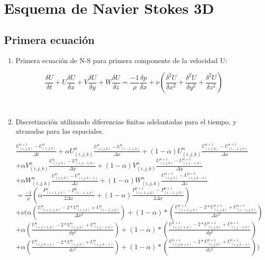 \documentclass[a4paper]{article}
\begin{document}
\newpage
\section{Esquema de Navier Stokes 3D}
\subsection{Primera ecuación}

\begin{enumerate}

\item Primera ecuación de N-S para primera componente de la velocidad U:

$$ \frac{\delta U}{\delta t} + U \frac{\delta U}{\delta x} + V \frac{\delta U}{\delta y} + W \frac{\delta U}{\delta z} =  \frac{-1}{\rho} \frac{\delta p}{\delta x} + \nu (\frac{{\delta}^{2} U}{\delta {x}^{2}} + \frac{{\delta}^{2} U}{\delta {y}^{2}} + \frac{{\delta}^{2} U}{\delta {z}^{2}}) $$

~\\

\item Discretización utilizando diferencias finitas adelantadas para el tiempo, y atrasadas para las espaciales.

$ \frac{ {U}^{n+1}_{(i,j,k)} - U^{n}_{(i,j,k)}}{ \Delta t}  +  \alpha {U}^{n}_{(i,j,k)} \frac{ {U}^{n}_{(i,j,k)} - U^{n}_{(i-1,j,k)}}{ \Delta x} + (1 - \alpha) {U}^{n}_{(i,j,k)} \frac{ {U}^{n+1}_{(i,j,k)} - U^{n+1}_{(i-1,j,k)}}{ \Delta x}$ 
\\
$+ \alpha {V}^{n}_{(i,j,k)} \frac{ {U}^{n}_{(i,j,k)} - U^{n}_{(i,j-1,k)}}{ \Delta y} + (1 - \alpha) {V}^{n}_{(i,j,k)} \frac{ {U}^{n+1}_{(i,j,k)} - U^{n+1}_{(i,j-1,k)}}{ \Delta y}$
\\
$+ \alpha {W}^{n}_{(i,j,k)} \frac{ {U}^{n}_{(i,j,k)} - U^{n}_{(i,j,k-1)}}{ \Delta z} + (1 - \alpha) {W}^{n}_{(i,j,k)} \frac{ {U}^{n+1}_{(i,j,k)} - U^{n+1}_{(i,j,k-1)}}{ \Delta z}$
\\
$= \frac{-1}{\rho} ( \alpha \frac{P^{n}_{(i+1,j,k)} - P^{n}_{(i-1,j,k)} }{ 2 \Delta x } + (1 - \alpha) \frac{P^{n+1}_{(i+1,j,k)} - P^{n+1}_{(i-1,j,k)} }{ 2 \Delta x })  $
\\
$+ \nu (\alpha (\frac{ U^{n}_{(i+1,j,k)} - 2*U^{n}_{(i,j,k)} + U^{n}_{(i-1,j,k)}}{\Delta x^2}) + (1-\alpha)*(\frac{ U^{n+1}_{(i+1,j,k)} - 2*U^{n+1}_{(i,j,k)} + U^{n+1}_{(i-1,j,k)}}{\Delta x^2})$
\\
$+ \alpha (\frac{ U^{n}_{(i,j+1,k)} - 2*U^{n}_{(i,j,k)} + U^{n}_{(i,j-1,k)}}{dy^2}) + (1-\alpha)*(\frac{ U^{n+1}_{(i,j+1,k)} - 2*U^{n+1}_{(i,j,k)} + U^{n+1}_{(i,j-1,k)}}{dy^2})$
\\
$+ \alpha (\frac{ U^{n}_{(i,j,k+1)} - 2*U^{n}_{(i,j,k)} + U^{n}_{(i,j,k-1)}}{dz^2}) + (1-\alpha)*(\frac{ U^{n+1}_{(i,j,k+1)} - 2*U^{n+1}_{(i,j,k)} + U^{n+1}_{(i,j,k-1)}}{dz^2}))$
~\\


\end{enumerate}
\end{document}
